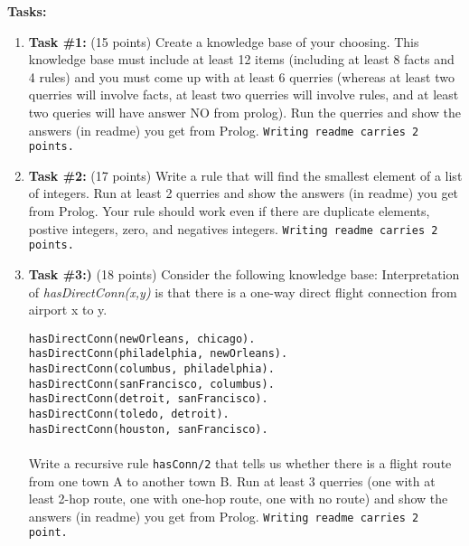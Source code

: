 \documentclass[paper=letter, fontsize=11pt]{scrartcl} %
\begin{document}
    \textbf{Tasks:}
    \begin{enumerate}

        \item \textbf{Task \#1:} (15 points) Create a knowledge base of your choosing. This knowledge base must include 
at least 12 items (including at least 8 facts and 4 rules) and you must come up with at least 6 querries (whereas at 
least two querries will involve facts, at least two querries will involve rules, and at least two queries will have answer 
NO from prolog). Run the querries and show the answers (in readme) you get from Prolog. \texttt{Writing readme carries 2 points.}

       \item \textbf{Task \#2:} (17 points) Write a rule that will find the smallest element of a list of integers. 
Run at least 2 querries and show the answers (in readme) you get from Prolog. 
Your rule should work even if there are duplicate elements, postive integers, zero, and negatives integers. \texttt{Writing readme carries 2 points.}


        \item \textbf{Task \#3:)} (18 points) Consider the following knowledge base:
Interpretation of \emph{hasDirectConn(x,y)} is that there is a one-way direct flight connection from airport x to y.

        \texttt{hasDirectConn(newOrleans, chicago).\\
        hasDirectConn(philadelphia, newOrleans).\\
        hasDirectConn(columbus, philadelphia).\\
        hasDirectConn(sanFrancisco, columbus).\\
        hasDirectConn(detroit, sanFrancisco).\\
        hasDirectConn(toledo, detroit).\\
        hasDirectConn(houston, sanFrancisco).\\
        } \\
        Write a recursive rule \texttt{hasConn/2} that tells us whether there is a flight route
from one town A to another town B. Run at least 3 querries (one with at least 2-hop route, one with one-hop route, one with no route)
and show the answers (in readme) you get from Prolog. \texttt{Writing readme carries 2 point.}


    
    \end{enumerate}
\end{document}
